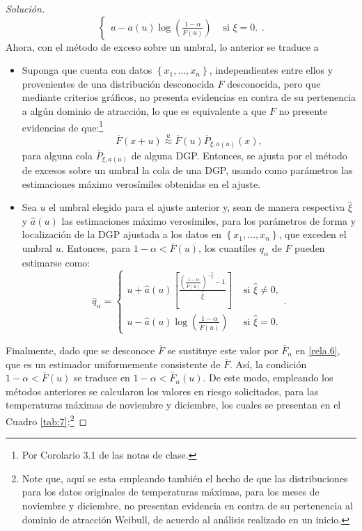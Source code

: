 \documentclass[10.5pt,notitlepage]{article}
\newenvironment{solucion}
  {\begin{proof}[Solución]}
  {\end{proof}}
\newcommand{\approxu}{\overset{u}{\approx}}
\newcommand{\corch}[1]{\left[ #1 \right]}
\newcommand{\kis}[1]{\left\{ #1 \right\}}
\newcommand{\pare}[1]{\left( #1 \right)}
\theoremstyle{plain}
\begin{document}
\begin{solucion}
\[\begin{cases}
u - a(u)\log\pare{\frac{1- \alpha }{\overline{F}(u)}}  & \text{ si } \xi = 0. 
\end{cases}.
 \]
Ahora, con el método de exceso sobre un umbral, lo anterior se traduce a
\begin{itemize}
    \item[1.] Suponga que cuenta con datos \(\kis{x_1,\hdots, x_n}\), independientes entre ellos y provenientes de una distribución desconocida \(F\) desconocida, pero que mediante criterios gráficos, no presenta evidencias en contra de su pertenencia a algún dominio de atracción, lo que es equivalente a que \(F\) no presente evidencias de que:\footnote{Por Corolario 3.1 de las notas de clase.}
   \[
    \overline{F}(x+u) \approxu \overline{F}(u)\overline{P}_{\xi,a(u)}(x),
   \]
    para alguna cola \(\overline{P}_{\xi, a(u)}\) de alguna DGP. Entonces, se ajusta por el método de excesos sobre un umbral la cola de una DGP, usando como parámetros las estimaciones máximo verosímiles obtenidas en el ajuste.   
    \item[2.] Sea \(u\) el umbral elegido para el ajuste anterior y, sean de manera respectiva \(\hat{\xi}\) y \(\hat{a}(u)\) las estimaciones máximo verosímiles, para los parámetros de forma y localización de la DGP ajustada a los datos en \(\kis{x_1, \hdots, x_{n}}\), que exceden el umbral \(u\). Entonces, para \(1 -\alpha < \overline{F}(u)\), los cuantíles \(q_{\alpha}\) de \(F\) pueden estimarse como:
     \begin{equation}\label{rela.6}
          \hat{q}_{\alpha}=\begin{cases}
u + \hat{a}(u)\corch{\frac{\pare{\frac{1 - \alpha}{\overline{F}(u)}}^{- \hat{\xi}} -1}{\hat{\xi}}} & \text{ si } \hat{\xi}\neq 0, \\ 
u - \hat{a}(u)\log\pare{\frac{1- \alpha }{\overline{F}(u)}}  & \text{ si } \hat{\xi} = 0. 
\end{cases}.
     \end{equation}
\end{itemize}
Finalmente, dado que se desconoce \(\overline{F}\) se sustituye este valor por \(\overline{F}_{n}\) en \eqref{rela.6}, que es un estimador uniformemente consistente de \(\overline{F}\). Así, la condición \(1 -\alpha < \overline{F}(u)\) se traduce en \(1- \alpha < \overline{F}_{n}(u)\). De este modo, empleando los métodos anteriores se calcularon los valores en riesgo solicitados, para las temperaturas máximas de noviembre y diciembre, los cuales se presentan en el Cuadro \ref{tab:7}:\footnote{Note que, aquí se esta empleando también el hecho de que las distribuciones para los datos originales de temperaturas máximas, para los meses de noviembre y diciembre, no presentan evidencia en contra de su pertenencia al dominio de atracción Weibull, de acuerdo al análisis realizado en un inicio.}

\end{solucion}
\end{document}
